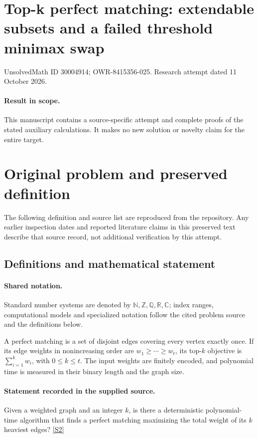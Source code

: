 \documentclass[11pt]{article}
\begin{document}
\section*{Top-k perfect matching: extendable subsets and a failed threshold minimax swap}
\noindent UnsolvedMath ID 30004914; OWR-8415356-025. Research attempt dated 11 October 2026.
\paragraph{Result in scope.}This manuscript contains a source-specific attempt and complete proofs of the stated auxiliary calculations. It makes no new solution or novelty claim for the entire target.
\section{Original problem and preserved definition}
The following definition and source list are reproduced from the repository. Any earlier inspection dates and reported literature claims in this preserved text describe that source record, not additional verification by this attempt.
\subsection{Definitions and mathematical statement}

\paragraph{Shared notation.}Standard number systems are denoted by $\mathbb N,\mathbb Z,\mathbb Q,\mathbb R,\mathbb C$; index ranges, computational models and specialized notation follow the cited problem source and the definitions below.


A perfect matching is a set of disjoint edges covering every vertex exactly once. If its edge weights in nonincreasing order are $w_1\geq\cdots\geq w_t$, its top-$k$ objective is $\sum_{i=1}^kw_i$, with $0\leq k\leq t$. The input weights are finitely encoded, and polynomial time is measured in their binary length and the graph size.
\paragraph{Statement recorded in the supplied source.}
Given a weighted graph and an integer $k$, is there a deterministic polynomial-time algorithm that finds a perfect matching maximizing the total weight of its $k$ heaviest edges? \href{https://doi.org/10.4171/owr/2021/53}{[S2]}
\end{document}
